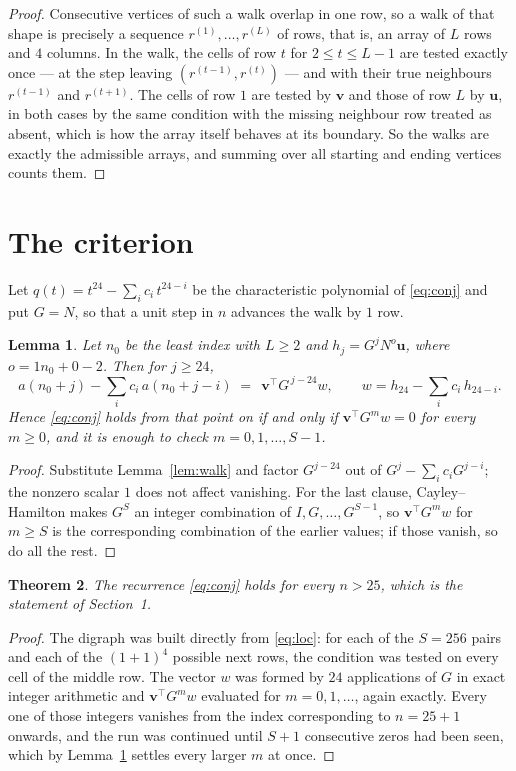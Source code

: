 \documentclass[11pt,a4paper]{article}
\theoremstyle{plain}
\newtheorem{theorem}{Theorem}
\newtheorem{lemma}[theorem]{Lemma}
\theoremstyle{definition}
\begin{document}
\begin{proof}
Consecutive vertices of such a walk overlap in one row, so a walk of that shape is
precisely a sequence $r^{(1)},\dots,r^{(L)}$ of rows, that is, an array of $L$ rows
and $4$ columns. In the walk, the cells of row $t$ for $2\le t\le L-1$ are tested
exactly once --- at the step leaving $(r^{(t-1)},r^{(t)})$ --- and with their true
neighbours $r^{(t-1)}$ and $r^{(t+1)}$. The cells of row $1$ are tested by
$\mathbf{v}$ and those of row $L$ by $\mathbf{u}$, in both cases by the same condition
with the missing neighbour row treated as absent, which is how the array itself behaves at
its boundary. So the walks are exactly the admissible arrays, and summing over all starting
and ending vertices counts them.
\end{proof}

\section{The criterion}

Let $q(t)=t^{24}-\sum_i c_i\,t^{24-i}$ be the characteristic polynomial of
\eqref{eq:conj} and put $G=N$, so that a unit step in $n$ advances the walk by
$1$ row.

\begin{lemma}\label{lem:crit}
Let $n_0$ be the least index with $L\ge2$ and $h_j=G^{j}N^{o}\mathbf{u}$, where
$o=1n_0+0-2$. Then for $j\ge24$,
\[
a(n_0+j)-\sum_i c_i\,a(n_0+j-i)\;=\;\,\mathbf{v}^{\!\top}G^{\,j-24}w,
\qquad w=h_{24}-\sum_i c_i\,h_{24-i} .
\]
Hence \eqref{eq:conj} holds from that point on if and only if
$\mathbf{v}^{\!\top}G^{m}w=0$ for every $m\ge0$, and it is enough to check
$m=0,1,\dots,S-1$.
\end{lemma}

\begin{proof}
Substitute Lemma~\ref{lem:walk} and factor $G^{j-24}$ out of
$G^{j}-\sum_ic_iG^{j-i}$; the nonzero scalar $1$ does not affect
vanishing. For the last clause, Cayley--Hamilton makes $G^{S}$ an integer combination of
$I,G,\dots,G^{S-1}$, so $\mathbf{v}^{\!\top}G^{m}w$ for $m\ge S$ is the corresponding
combination of the earlier values; if those vanish, so do all the rest.
\end{proof}

\begin{theorem}
The recurrence \eqref{eq:conj} holds for every $n>25$, which is the statement of
Section~1.
\end{theorem}

\begin{proof}
The digraph was built directly from \eqref{eq:loc}: for each of the $S=256$ pairs and each
of the $(1+1)^{4}$ possible next rows, the condition was tested on every cell of
the middle row. The vector $w$ was formed by $24$ applications of $G$ in exact integer
arithmetic and $\mathbf{v}^{\!\top}G^{m}w$ evaluated for $m=0,1,\dots$, again exactly.
Every one of those integers vanishes from the index corresponding to $n=25+1$ onwards,
and the run was continued until $S+1$ consecutive zeros had been seen, which by
Lemma~\ref{lem:crit} settles every larger $m$ at once.
\end{proof}
\end{document}
